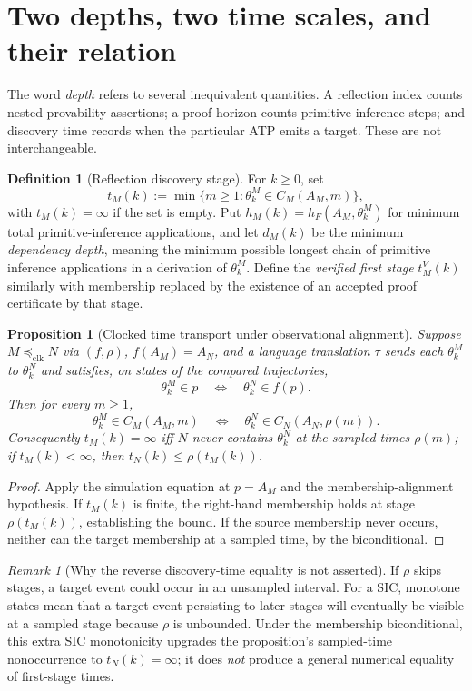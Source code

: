 \documentclass[11pt,letterpaper]{article}
\newtheorem{proposition}[theorem]{Proposition}
\theoremstyle{definition}\newtheorem{definition}[theorem]{Definition}\newtheorem{example}[theorem]{Example}\newtheorem{protocol}[theorem]{Protocol}\newtheorem{question}[theorem]{Open Problem}
\theoremstyle{remark}\newtheorem{remark}[theorem]{Remark}
\newcommand{\clksim}{\preceq_{\mathrm{clk}}}
\begin{document}
\section{Two depths, two time scales, and their relation}
The word \emph{depth} refers to several inequivalent quantities. A reflection index counts nested provability assertions; a proof horizon counts primitive inference steps; and discovery time records when the particular ATP emits a target. These are not interchangeable.
\begin{definition}[Reflection discovery stage]
For $k\ge0$, set
\[
t_M(k):=\min\{m\ge1:\theta_k^M\in C_M(A_M,m)\},
\]
with $t_M(k)=\infty$ if the set is empty. Put $h_M(k)=h_F(A_M,\theta_k^M)$ for minimum total primitive-inference applications, and let $d_M(k)$ be the minimum \emph{dependency depth}, meaning the minimum possible longest chain of primitive inference applications in a derivation of $\theta_k^M$. Define the \emph{verified first stage} $t_M^V(k)$ similarly with membership replaced by the existence of an accepted proof certificate by that stage.
\end{definition}
\begin{proposition}[Clocked time transport under observational alignment]\label{prop:time}
Suppose $M\clksim N$ via $(f,\rho)$, $f(A_M)=A_N$, and a language translation $\tau$ sends each $\theta_k^M$ to $\theta_k^N$ and satisfies, on states of the compared trajectories,
\[
\theta_k^M\in p \quad\Longleftrightarrow\quad \theta_k^N\in f(p).
\]
Then for every $m\ge1$,
\[
\theta_k^M\in C_M(A_M,m)\quad\Longleftrightarrow\quad
\theta_k^N\in C_N(A_N,\rho(m)).
\]
Consequently $t_M(k)=\infty$ iff $N$ never contains $\theta_k^N$ at the sampled times $\rho(m)$; if $t_M(k)<\infty$, then $t_N(k)\le\rho(t_M(k))$.
\end{proposition}
\begin{proof}
Apply the simulation equation at $p=A_M$ and the membership-alignment hypothesis. If $t_M(k)$ is finite, the right-hand membership holds at stage $\rho(t_M(k))$, establishing the bound. If the source membership never occurs, neither can the target membership at a sampled time, by the biconditional.
\end{proof}
\begin{remark}[Why the reverse discovery-time equality is not asserted]
If $\rho$ skips stages, a target event could occur in an unsampled interval. For a SIC, monotone states mean that a target event persisting to later stages will eventually be visible at a sampled stage because $\rho$ is unbounded. Under the membership biconditional, this extra SIC monotonicity upgrades the proposition's sampled-time nonoccurrence to $t_N(k)=\infty$; it does \emph{not} produce a general numerical equality of first-stage times.
\end{remark}
\end{document}
